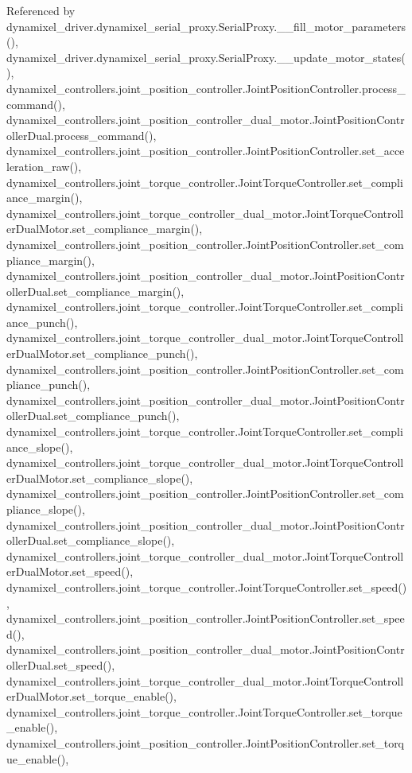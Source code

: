 Referenced by dynamixel\+\_\+driver.\+dynamixel\+\_\+serial\+\_\+proxy.\+Serial\+Proxy.\+\_\+\+\_\+fill\+\_\+motor\+\_\+parameters(), dynamixel\+\_\+driver.\+dynamixel\+\_\+serial\+\_\+proxy.\+Serial\+Proxy.\+\_\+\+\_\+update\+\_\+motor\+\_\+states(), dynamixel\+\_\+controllers.\+joint\+\_\+position\+\_\+controller.\+Joint\+Position\+Controller.\+process\+\_\+command(), dynamixel\+\_\+controllers.\+joint\+\_\+position\+\_\+controller\+\_\+dual\+\_\+motor.\+Joint\+Position\+Controller\+Dual.\+process\+\_\+command(), dynamixel\+\_\+controllers.\+joint\+\_\+position\+\_\+controller.\+Joint\+Position\+Controller.\+set\+\_\+acceleration\+\_\+raw(), dynamixel\+\_\+controllers.\+joint\+\_\+torque\+\_\+controller.\+Joint\+Torque\+Controller.\+set\+\_\+compliance\+\_\+margin(), dynamixel\+\_\+controllers.\+joint\+\_\+torque\+\_\+controller\+\_\+dual\+\_\+motor.\+Joint\+Torque\+Controller\+Dual\+Motor.\+set\+\_\+compliance\+\_\+margin(), dynamixel\+\_\+controllers.\+joint\+\_\+position\+\_\+controller.\+Joint\+Position\+Controller.\+set\+\_\+compliance\+\_\+margin(), dynamixel\+\_\+controllers.\+joint\+\_\+position\+\_\+controller\+\_\+dual\+\_\+motor.\+Joint\+Position\+Controller\+Dual.\+set\+\_\+compliance\+\_\+margin(), dynamixel\+\_\+controllers.\+joint\+\_\+torque\+\_\+controller.\+Joint\+Torque\+Controller.\+set\+\_\+compliance\+\_\+punch(), dynamixel\+\_\+controllers.\+joint\+\_\+torque\+\_\+controller\+\_\+dual\+\_\+motor.\+Joint\+Torque\+Controller\+Dual\+Motor.\+set\+\_\+compliance\+\_\+punch(), dynamixel\+\_\+controllers.\+joint\+\_\+position\+\_\+controller.\+Joint\+Position\+Controller.\+set\+\_\+compliance\+\_\+punch(), dynamixel\+\_\+controllers.\+joint\+\_\+position\+\_\+controller\+\_\+dual\+\_\+motor.\+Joint\+Position\+Controller\+Dual.\+set\+\_\+compliance\+\_\+punch(), dynamixel\+\_\+controllers.\+joint\+\_\+torque\+\_\+controller.\+Joint\+Torque\+Controller.\+set\+\_\+compliance\+\_\+slope(), dynamixel\+\_\+controllers.\+joint\+\_\+torque\+\_\+controller\+\_\+dual\+\_\+motor.\+Joint\+Torque\+Controller\+Dual\+Motor.\+set\+\_\+compliance\+\_\+slope(), dynamixel\+\_\+controllers.\+joint\+\_\+position\+\_\+controller.\+Joint\+Position\+Controller.\+set\+\_\+compliance\+\_\+slope(), dynamixel\+\_\+controllers.\+joint\+\_\+position\+\_\+controller\+\_\+dual\+\_\+motor.\+Joint\+Position\+Controller\+Dual.\+set\+\_\+compliance\+\_\+slope(), dynamixel\+\_\+controllers.\+joint\+\_\+torque\+\_\+controller\+\_\+dual\+\_\+motor.\+Joint\+Torque\+Controller\+Dual\+Motor.\+set\+\_\+speed(), dynamixel\+\_\+controllers.\+joint\+\_\+torque\+\_\+controller.\+Joint\+Torque\+Controller.\+set\+\_\+speed(), dynamixel\+\_\+controllers.\+joint\+\_\+position\+\_\+controller.\+Joint\+Position\+Controller.\+set\+\_\+speed(), dynamixel\+\_\+controllers.\+joint\+\_\+position\+\_\+controller\+\_\+dual\+\_\+motor.\+Joint\+Position\+Controller\+Dual.\+set\+\_\+speed(), dynamixel\+\_\+controllers.\+joint\+\_\+torque\+\_\+controller\+\_\+dual\+\_\+motor.\+Joint\+Torque\+Controller\+Dual\+Motor.\+set\+\_\+torque\+\_\+enable(), dynamixel\+\_\+controllers.\+joint\+\_\+torque\+\_\+controller.\+Joint\+Torque\+Controller.\+set\+\_\+torque\+\_\+enable(), dynamixel\+\_\+controllers.\+joint\+\_\+position\+\_\+controller.\+Joint\+Position\+Controller.\+set\+\_\+torque\+\_\+enable(), 